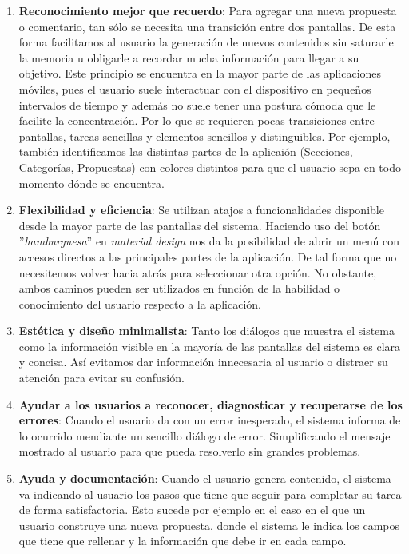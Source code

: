 \begin{enumerate}
  \item \textbf{Reconocimiento mejor que recuerdo}: Para agregar una nueva propuesta o comentario, tan sólo se necesita una transición entre dos pantallas. De esta forma facilitamos al usuario la generación de nuevos contenidos sin saturarle la memoria u obligarle a recordar mucha información para llegar a su objetivo. Este principio se encuentra en la mayor parte de las aplicaciones móviles, pues el usuario suele interactuar con el dispositivo en pequeños intervalos de tiempo y además no suele tener una postura cómoda que le facilite la concentración. Por lo que se requieren pocas transiciones entre pantallas, tareas sencillas y elementos sencillos y distinguibles. Por ejemplo, también identificamos las distintas partes de la aplicaión (Secciones, Categorías, Propuestas) con colores distintos para que el usuario sepa en todo momento dónde se encuentra. 
  \item \textbf{Flexibilidad y eficiencia}: Se utilizan atajos a funcionalidades disponible desde la mayor parte de las pantallas del sistema. Haciendo uso del botón ''\textit{hamburguesa}'' en \textit{material design} nos da la posibilidad de abrir un menú con accesos directos a las principales partes de la aplicación. De tal forma que no necesitemos volver hacia atrás para seleccionar otra opción. No obstante, ambos caminos pueden ser utilizados en función de la habilidad o conocimiento del usuario respecto a la aplicación.
  \item \textbf{Estética y diseño minimalista}: Tanto los diálogos que muestra el sistema como la información visible en la mayoría de las pantallas del sistema es clara y concisa. Así evitamos dar información innecesaria al usuario o distraer su atención para evitar su confusión.
  \item \textbf{Ayudar a los usuarios a reconocer, diagnosticar y recuperarse de los errores}: Cuando el usuario da con un error inesperado, el sistema informa de lo ocurrido mendiante un sencillo diálogo de error. Simplificando el mensaje mostrado al usuario para que pueda resolverlo sin grandes problemas.
  \item \textbf{Ayuda y documentación}: Cuando el usuario genera contenido, el sistema  va indicando al usuario los pasos que tiene que seguir para completar su tarea de forma satisfactoria. Esto sucede por ejemplo en el caso en el que un usuario construye una nueva propuesta, donde el sistema le indica los campos que tiene que rellenar y la información que debe ir en cada campo.
\end{enumerate}
